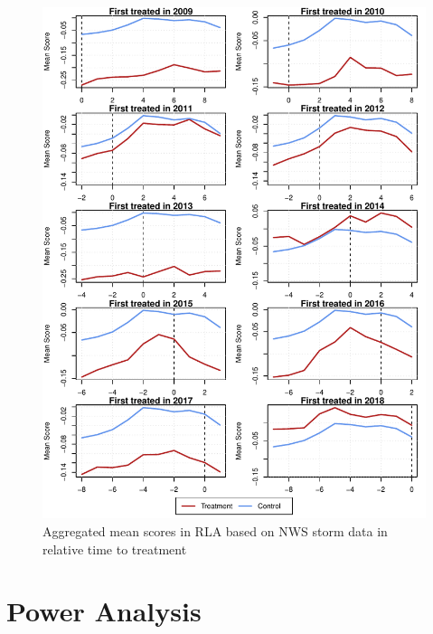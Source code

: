 \begin{figure}[!h]
	\centering
	\includegraphics[scale=1]{"../Code & Data/ParTrendsPlotRLAStorm.pdf"}
	\caption{Aggregated mean scores in RLA based on NWS storm data in relative time to treatment}
	\label{PreTrendsRLAStorm}
\end{figure}

\newpage

\section{Power Analysis} \label{PowerAna}


